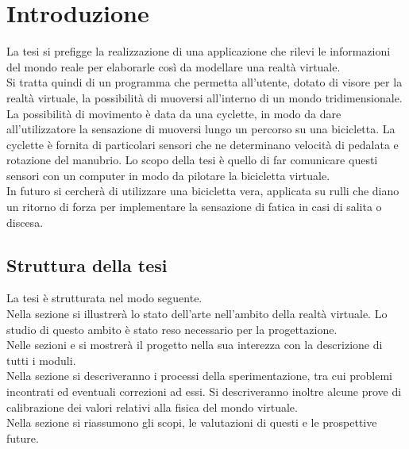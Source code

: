 \chapter{Introduzione}
\label{Introduzione}

\noindent La tesi si prefigge la realizzazione di una applicazione che rilevi le informazioni del mondo reale per elaborarle così da modellare una realtà virtuale.\\

\noindent Si tratta quindi di un programma che permetta all’utente, dotato di visore per la realtà virtuale, la possibilità di muoversi all’interno di un mondo tridimensionale. La possibilità di movimento è data da una cyclette, in modo da dare all'utilizzatore la sensazione di muoversi lungo un percorso su una bicicletta. La cyclette è fornita di particolari sensori che ne determinano velocità di pedalata e rotazione del manubrio. Lo scopo della tesi è quello di far comunicare questi sensori con un computer in modo da pilotare la bicicletta virtuale.\\

\noindent In futuro si cercherà di utilizzare una bicicletta vera, applicata su rulli che diano un ritorno di forza per implementare la sensazione di fatica in casi di salita o discesa. 
\newpage
\section{Struttura della tesi}
\noindent La tesi è strutturata nel modo seguente.\\
Nella sezione \textit{} si illustrerà lo stato dell'arte nell'ambito della realtà virtuale. Lo studio di questo ambito è stato reso necessario per la progettazione.\\
\noindent Nelle sezioni \textit{} e \textit{} si mostrerà il progetto nella sua interezza con la descrizione di tutti i moduli.\\
\noindent Nella sezione \textit{} si descriveranno i processi della sperimentazione, tra cui problemi incontrati ed eventuali correzioni ad essi. Si descriveranno inoltre alcune prove di calibrazione dei valori relativi alla fisica del mondo virtuale.\\
\noindent Nella sezione \textit{} si riassumono gli scopi, le valutazioni di questi e le prospettive future.







